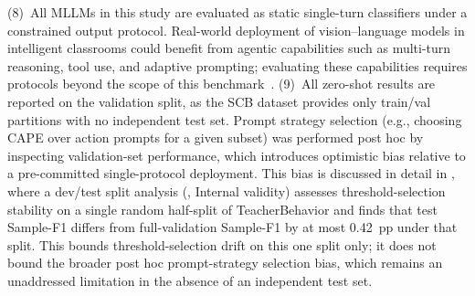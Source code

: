 \documentclass[symmetry,article,submit,pdftex,moreauthors]{Definitions/mdpi}
\begin{document}
(8)~All MLLMs in this study are evaluated as static single-turn classifiers under a constrained output protocol. Real-world deployment of vision--language models in intelligent classrooms could benefit from agentic capabilities such as multi-turn reasoning, tool use, and adaptive prompting; evaluating these capabilities requires protocols beyond the scope of this benchmark~\cite{ma2026agentic_ai}.
(9)~All zero-shot results are reported on the validation split, as the SCB dataset provides only train/val partitions with no independent test set. Prompt strategy selection (e.g., choosing CAPE over action prompts for a given subset) was performed post hoc by inspecting validation-set performance, which introduces optimistic bias relative to a pre-committed single-protocol deployment. This bias is discussed in detail in , where a dev/test split analysis (, Internal validity) assesses threshold-selection stability on a single random half-split of TeacherBehavior and finds that test Sample-F1 differs from full-validation Sample-F1 by at most 0.42~pp under that split. This bounds threshold-selection drift on this one split only; it does not bound the broader post hoc prompt-strategy selection bias, which remains an unaddressed limitation in the absence of an independent test set.
\end{document}
